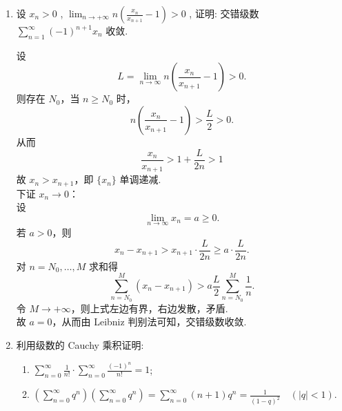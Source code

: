\begin{enumerate}
    \item[5.]设 \(\displaystyle x_{n} > 0\) , \(\displaystyle \lim_{n \to +\infty} n \left(\frac{x_{n}}{x_{n+1}} -1\right) > 0\) , 
    证明: 交错级数 \(\displaystyle\sum_{n=1}^{\infty} (-1)^{n+1} x_{n}\) 收敛.
    \begin{solution}
        设 
        \[
        L = \lim_{n\to\infty} n \left( \frac{x_n}{x_{n+1}} - 1 \right) > 0.
        \]
        则存在 $N_0$，当 $n \ge N_0$ 时，
        \[
        n \left( \frac{x_n}{x_{n+1}} - 1 \right) > \frac{L}{2} > 0.
        \]
        从而 
        \[
        \frac{x_n}{x_{n+1}} > 1 + \frac{L}{2n} > 1
        \]
        故 $x_n > x_{n+1}$，即 $\{x_n\}$ 单调递减.\\
        下证 $x_n \to 0$：\\
        设 
        \[
        \lim_{n\to\infty} x_n = a \ge 0.
        \]
        若 $a > 0$，则
        \[
        x_n - x_{n+1} > x_{n+1} \cdot \frac{L}{2n} \ge a \cdot \frac{L}{2n}.
        \]
        对 $n = N_0, \dots, M$ 求和得
        \[
        \sum_{n=N_0}^{M} (x_n - x_{n+1}) > a \frac{L}{2} \sum_{n=N_0}^{M} \frac{1}{n}.
        \]
        令 $M\to+\infty$，则上式左边有界，右边发散，矛盾.\\
        故 $a = 0$，从而由 Leibniz 判别法可知，交错级数收敛.
    \end{solution}

    \item[6.]利用级数的 Cauchy 乘积证明:
    \begin{enumerate}
        \item[(a)]$\displaystyle \sum_{n = 0}^{\infty}\frac{1}{n!}\cdot \sum_{n = 0}^{\infty}\frac{(-1)^{n}}{n!} = 1$;
        \item[(b)]$\displaystyle \left(\sum_{n = 0}^{\infty}q^{n}\right)\left(\sum_{n = 0}^{\infty}q^{n}\right) = \sum_{n = 0}^{\infty}(n + 1)q^{n} = \frac{1}{(1 - q)^{2}}\quad (|q|< 1).$
    \end{enumerate}
    

\end{enumerate}
